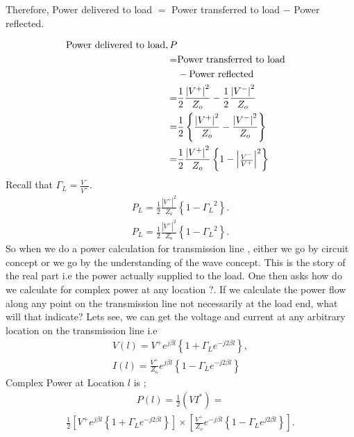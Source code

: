 Therefore, Power delivered to load $=$ Power transferred to load $-$ Power reflected.

\begin{align*} 
\textnormal{Power delivered to load}, P\\
=& \textnormal{Power transferred to load}\\
&- \textnormal{Power reflected}\\
=& \frac{1}{2} \frac{{|V^+|}^2}{Z_o} -\frac{1}{2} \frac{{|V^-|}^2 }{Z_o}\\
=& \frac{1}{2} \left\lbrace \frac{{|V^+| }^2}{Z_o} -\frac{ {|V^-|}^2 }{Z_o} \right\rbrace\\
=& \frac{1}{2} \frac{{|V^+|}^2}{Z_o} \left\lbrace 1 - {
\begin{vmatrix}
\frac{V^-}{V^+}
\end{vmatrix}^2}\right\rbrace
\end{align*}
Recall that $\Gamma_L =\frac{V^-}{V^+}$.
\begin{align*}
P_L=\frac{1}{2} \frac{{|V^+|}^2}{Z_o} \left\lbrace 1 - { \Gamma_L }^2 \right\rbrace.
\end{align*}
\begin{align*}
P_L=\frac{1}{2} \frac{{| V^+ |}^2}{Z_o} \left\lbrace 1 - { \Gamma_L }^2 \right\rbrace.
\end{align*}
So when we do a power calculation for transmission line , either we go by circuit concept or we go by the understanding of the wave concept. This is the story of the real part i.e the power actually supplied to the load. One then asks how do we calculate for complex power at any location $?$. If we calculate the power flow along any point on the transmission line not necessarily at the load end, what will that indicate$?$ Lets see, we can get the voltage and current at any arbitrary location on the transmission line i.e
\begin{align*} 
V(l) = V^+ e^{j\beta l} \left\lbrace 1 + \Gamma_L e^{-j2\beta l} \right\rbrace ,\\ 
I(l) = \frac{V^+}{Z_o} e^{j\beta l} \left\lbrace 1 - \Gamma_L e^{-j2\beta l} \right\rbrace
\end{align*}
Complex Power at Location $l$ is ;
\begin{align*}
P(l) = \frac{1}{2} (V I^*) =
\end{align*}
\begin{align*}
\frac{1}{2} [V^+ e^{j\beta l} \left\lbrace 1 + \Gamma_L e^{-j2\beta l} \right\rbrace ] \times [\frac{V^+}{Z_o} e^{-j\beta l} \left\lbrace 1 - \Gamma_L e^{j2\beta l} \right\rbrace].
\end{align*}
